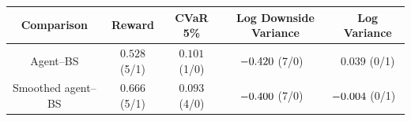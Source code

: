 \begingroup
\footnotesize
\renewcommand{\arraystretch}{1.16}
\setlength{\tabcolsep}{5pt}
\begin{tabular}{@{}ccccc@{}}
\toprule
Comparison & Reward & CVaR 5\% & Log Downside Variance & Log Variance \\
\midrule
Agent--BS & $0.528$ (5/1) & $0.101$ (1/0) & $\mathllap{-}0.420$ (7/0) & $0.039$ (0/1) \\
Smoothed agent--BS & $0.666$ (5/1) & $0.093$ (4/0) & $\mathllap{-}0.400$ (7/0) & $\mathllap{-}0.004$ (0/1) \\
\bottomrule
\end{tabular}
\endgroup
